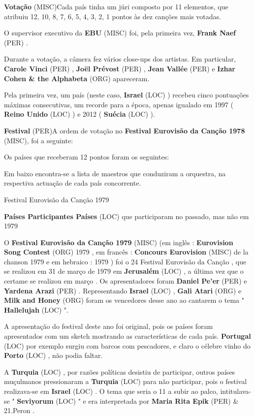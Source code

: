 \documentclass[12pt,a4paper]{article}
\begin{document}
\textbf{Votação} (MISC)Cada país tinha um júri composto por 11 elementos, que atribuiu 12, 10, 8, 7, 6, 5, 4, 3, 2, 1 pontos às dez canções mais votadas.

O supervisor executivo da \textbf{EBU} (MISC) foi, pela primeira vez, \textbf{Frank Naef} (PER) .

Durante a votação, a câmera fez vários close-ups dos artistas. Em particular, \textbf{Carole Vinci} (PER) , \textbf{Joël Prévost} (PER) , \textbf{Jean Vallée} (PER) e \textbf{Izhar Cohen \& the Alphabeta} (ORG) apareceram.

Pela primeira vez, um país (neste caso, \textbf{Israel} (LOC) ) recebeu cinco pontuações máximas consecutivas, um recorde para a época, apenas igualado em 1997 ( \textbf{Reino Unido} (LOC) ) e 2012 ( \textbf{Suécia} (LOC) ).



\textbf{Festival} (PER)A ordem de votação no \textbf{Festival Eurovisão da Canção 1978} (MISC), foi a seguinte:

Os países que receberam 12 pontos foram os seguintes:

Em baixo encontra-se a lista de maestros que conduziram a orquestra, na respectiva actuação de cada país concorrente.



Festival Eurovisão da Canção 1979



\textbf{Países Participantes Países} (LOC) que participaram no passado, mas não em 1979

O \textbf{Festival Eurovisão da Canção 1979} (MISC) (em inglês : \textbf{Eurovision Song Contest} (ORG) 1979 , em francês : \textbf{Concours Eurovision} (MISC) de la chanson 1979 e em hebraico :  1979 ) foi o 24 Festival Eurovisão da Canção , que se realizou em 31 de março de 1979 em \textbf{Jerusalém} (LOC) , a última vez que o certame se realizou em março . Os apresentadores foram \textbf{Daniel Pe'er} (PER) e \textbf{Yardena Arazi} (PER) . Representando \textbf{Israel} (LOC) , \textbf{Gali Atari} (ORG) e \textbf{Milk and Honey} (ORG) foram os vencedores desse ano ao cantarem o tema " \textbf{Hallelujah} (LOC) ".

A apresentação do festival deste ano foi original, pois os países foram apresentados com um sketch mostrando as características de cada país. \textbf{Portugal} (LOC) por exemplo surgiu com barcos com pescadores, e claro o célebre vinho do \textbf{Porto} (LOC) , não podia faltar.

A \textbf{Turquia} (LOC) , por razões políticas desistiu de participar, outros países muçulmanos pressionaram a \textbf{Turquia} (LOC) para não participar, pois o festival realizava-se em \textbf{Israel} (LOC) . O tema que seria o 11 a subir ao palco, intitulava-se " \textbf{Seviyorum} (LOC) " e era interpretada por \textbf{Maria Rita Epik} (PER) \& 21.Peron .
\end{document}
